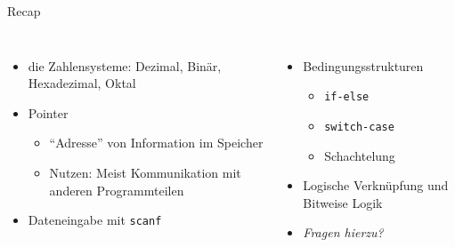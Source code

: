 \begin{frame}{Recap}
%
\begin{columns}[T]
\begin{itemize}
\item die Zahlensysteme: Dezimal, Binär, Hexadezimal, Oktal
\item Pointer
	\begin{itemize}
	\item \enquote{Adresse} von Information im Speicher
	\item Nutzen: Meist Kommunikation mit anderen Programmteilen
	\end{itemize}
\item Dateneingabe mit \texttt{scanf}
\end{itemize}
%
\begin{itemize}
\item Bedingungsstrukturen
	\begin{itemize}
	\item \texttt{if-else}
	\item \texttt{switch-case}
	\item Schachtelung
	\end{itemize}
\item Logische Verknüpfung und Bitweise Logik
\item \emph{Fragen hierzu?}
\end{itemize}
\end{columns}
%
\end{frame}


